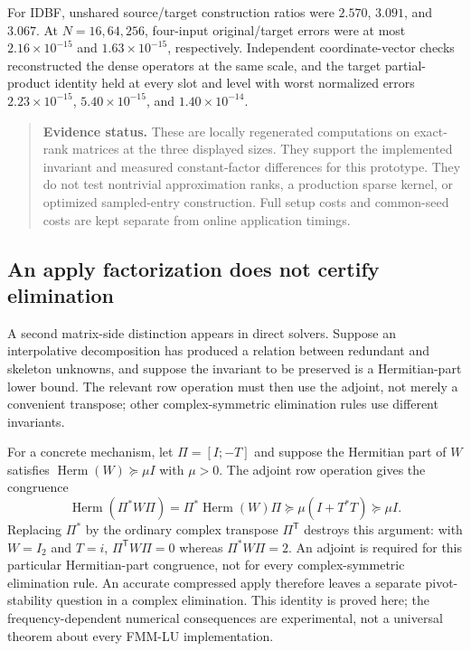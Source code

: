 \documentclass[11pt,a4paper]{article}
\newcommand{\T}{\mathsf{T}}
\newenvironment{evidence}{\begin{quote}\small\color{muted}\textbf{Evidence status.} }{\end{quote}}
\begin{document}
For IDBF, unshared source/target construction ratios were $2.570$, $3.091$, and $3.067$. At $N=16,64,256$, four-input original/target errors were at most $2.16\times10^{-15}$ and $1.63\times10^{-15}$, respectively. Independent coordinate-vector checks reconstructed the dense operators at the same scale, and the target partial-product identity held at every slot and level with worst normalized errors $2.23\times10^{-15}$, $5.40\times10^{-15}$, and $1.40\times10^{-14}$.
\begin{evidence}
These are locally regenerated computations on exact-rank matrices at the three displayed sizes. They support the implemented invariant and measured constant-factor differences for this prototype. They do not test nontrivial approximation ranks, a production sparse kernel, or optimized sampled-entry construction. Full setup costs and common-seed costs are kept separate from online application timings.
\end{evidence}

\subsection{An apply factorization does not certify elimination}
A second matrix-side distinction appears in direct solvers. Suppose an interpolative decomposition has produced a relation between redundant and skeleton unknowns, and suppose the invariant to be preserved is a Hermitian-part lower bound. The relevant row operation must then use the adjoint, not merely a convenient transpose; other complex-symmetric elimination rules use different invariants.

For a concrete mechanism, let $\Pi=[I;-T]$ and suppose the Hermitian part of $W$ satisfies $\operatorname{Herm}(W)\succeq\mu I$ with $\mu>0$. The adjoint row operation gives the congruence
\begin{equation}
 \operatorname{Herm}(\Pi^*W\Pi)
 =\Pi^*\operatorname{Herm}(W)\Pi
 \succeq\mu(I+T^*T)\succeq\mu I .
 \label{eq:adjoint-congruence}
\end{equation}
Replacing $\Pi^*$ by the ordinary complex transpose $\Pi^{\T}$ destroys this argument: with $W=I_2$ and $T=i$, $\Pi^{\T}W\Pi=0$ whereas $\Pi^*W\Pi=2$. An adjoint is required for this particular Hermitian-part congruence, not for every complex-symmetric elimination rule. An accurate compressed apply therefore leaves a separate pivot-stability question in a complex elimination. This identity is proved here; the frequency-dependent numerical consequences are experimental, not a universal theorem about every FMM-LU implementation.
\end{document}

